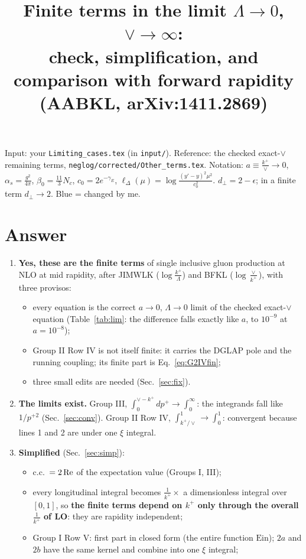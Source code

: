 \documentclass[10pt]{article}
\title{Finite terms in the limit $\Lambda\to0$, $\vee\to\infty$:\\ check, simplification, and comparison with forward rapidity (AABKL, arXiv:1411.2869)}
\date{}
\numberwithin{equation}{section}
\newcommand{\new}[1]{{\color{blue}#1}}
\newcommand{\Ein}{\mathrm{Ein}}
\begin{document}
\maketitle
\noindent Input: your \texttt{Limiting\_cases.tex} (in \texttt{input/}). Reference: the checked exact-$\vee$ remaining terms, \texttt{neglog/corrected/Other\_terms.tex}. Notation: $a\equiv\frac{k^+}{\vee}\to0$, $\alpha_s=\frac{g^2}{4\pi}$, $\beta_0=\frac{11}{3}N_c$, $c_0=2e^{-\gamma_E}$, $\ell_\Delta(\mu)=\log\frac{(y'-y)^2\mu^2}{c_0^2}$. $d_\perp=2-\epsilon$; in a finite term $d_\perp\to2$. \new{Blue} = changed by me.

\section{Answer}
\begin{enumerate}
\item \textbf{Yes, these are the finite terms} of single inclusive gluon production at NLO at mid rapidity, after JIMWLK ($\log\frac{k^+}{\Lambda}$) and BFKL ($\log\frac{\vee}{k^+}$), with three provisos:
\begin{itemize}
\item every equation is the correct $a\to0$, $\Lambda\to0$ limit of the checked exact-$\vee$ equation (Table~\ref{tab:lim}: the difference falls exactly like $a$, to $10^{-9}$ at $a=10^{-8}$);
\item Group II Row IV is not itself finite: it carries the DGLAP pole and the running coupling; its finite part is Eq.~\eqref{eq:G2IVfin};
\item three small edits are needed (Sec.~\ref{sec:fix}).
\end{itemize}
\item \textbf{The limits exist.} Group III, $\int_0^{\vee-k^+}dp^+\to\int_0^\infty$: the integrands fall like $1/p^{+2}$ (Sec.~\ref{sec:conv}). Group II Row IV, $\int_{k^+/\vee}^1\to\int_0^1$: convergent because lines 1 and 2 are under one $\xi$ integral.
\item \textbf{Simplified} (Sec.~\ref{sec:simp}):
\begin{itemize}
\item c.c.\ $=2\,{\rm Re}$ of the expectation value (Groups I, III);
\item every longitudinal integral becomes $\frac{1}{k^+}\times$ a dimensionless integral over $[0,1]$, so \textbf{the finite terms depend on $k^+$ only through the overall $\frac{1}{k^+}$ of LO}: they are rapidity independent;
\item Group I Row V: first part in closed form (the entire function $\Ein$); $2a$ and $2b$ have the same kernel and combine into one $\xi$ integral;

\end{itemize}
\end{enumerate}
\end{document}

